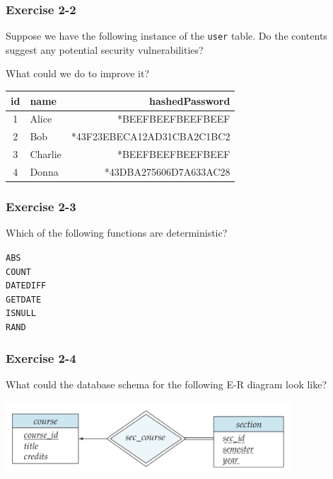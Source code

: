 \begin{frame}
\frametitle{Exercise 2-2}

Suppose we have the following instance of the \texttt{user} table. Do the contents suggest any potential security vulnerabilities?

What could we do to improve it?

\begin{center}
  \begin{tabular}{||c l r||}
  \hline
  id & name & hashedPassword \\ [0.5ex]
  \hline\hline
  1 & Alice & *BEEFBEEFBEEFBEEF \\
  \hline
  2 & Bob & *43F23EBECA12AD31CBA2C1BC2 \\
  \hline
  3 & Charlie & *BEEFBEEFBEEFBEEF \\
  \hline
  4 & Donna & *43DBA275606D7A633AC28 \\
  \hline
\end{tabular}
\end{center}

\end{frame}


\begin{frame}
\frametitle{Exercise 2-3}

Which of the following functions are deterministic?

\texttt{ABS} \\
\texttt{COUNT} \\
\texttt{DATEDIFF} \\
\texttt{GETDATE} \\
\texttt{ISNULL} \\
\texttt{RAND} \\

\end{frame}


\begin{frame}
\frametitle{Exercise 2-4}

What could the database schema for the following E-R diagram look like?

\begin{center}
  \includegraphics[width=0.8\textwidth]{images/weak-entity-set}
\end{center}

\end{frame}


